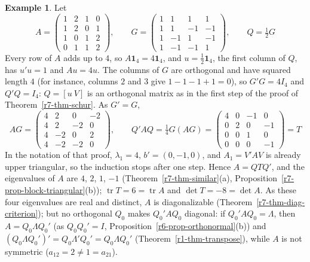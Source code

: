 \documentclass[12pt]{article}
\newcommand{\one}{\mathbf 1}
\DeclareMathOperator{\tr}{tr}
\theoremstyle{definition}
\newtheorem{example}[theorem]{Example}
\begin{document}
\begin{example}\label{r7-exm-schur}
Let
\[
A=\begin{pmatrix}1&2&1&0\\1&2&0&1\\1&0&1&2\\0&1&1&2\end{pmatrix},\qquad
G=\begin{pmatrix}1&1&1&1\\1&1&-1&-1\\1&-1&1&-1\\1&-1&-1&1\end{pmatrix},\qquad Q=\tfrac12G
\]
Every row of \(A\) adds up to \(4\), so \(A\one_4=4\one_4\), and \(u=\frac12\one_4\), the first column of \(Q\), has
\(u'u=1\) and \(Au=4u\). The columns of \(G\) are orthogonal and have squared length \(4\) (for instance, columns \(2\)
and \(3\) give \(1-1-1+1=0\)), so \(G'G=4I_4\) and \(Q'Q=I_4\): \(Q=[u\ V]\) is an orthogonal matrix as in the first
step of the proof of Theorem~\ref{r7-thm-schur}. As \(G'=G\),
\[
AG=\begin{pmatrix}4&2&0&-2\\4&2&-2&0\\4&-2&0&2\\4&-2&-2&0\end{pmatrix},\qquad
Q'AQ=\tfrac14G(AG)=\begin{pmatrix}4&0&-1&0\\0&2&0&-1\\0&0&1&0\\0&0&0&-1\end{pmatrix}=T
\]
In the notation of that proof, \(\lambda_1=4\), \(b'=(0,-1,0)\), and \(A_1=V'AV\) is already upper triangular, so the
induction stops after one step. Hence \(A=QTQ'\), and the eigenvalues of \(A\) are \(4\), \(2\), \(1\), \(-1\)
(Theorem~\ref{r7-thm-similar}(a), Proposition~\ref{r7-prop-block-triangular}(b)); \(\tr T=6=\tr A\) and
\(\det T=-8=\det A\). As these four eigenvalues are real and distinct, \(A\) is diagonalizable
(Theorem~\ref{r7-thm-diag-criterion}); but no orthogonal \(Q_0\) makes \(Q_0'AQ_0\) diagonal: if \(Q_0'AQ_0=\Lambda\),
then \(A=Q_0\Lambda Q_0'\) (as \(Q_0Q_0'=I\), Proposition~\ref{r6-prop-orthonormal}(b)) and \((Q_0\Lambda Q_0')'=Q_0\Lambda'Q_0'=Q_0\Lambda Q_0'\) (Theorem~\ref{r1-thm-transpose}), while
\(A\) is not symmetric (\(a_{12}=2\ne1=a_{21}\)).
\end{example}
\end{document}
